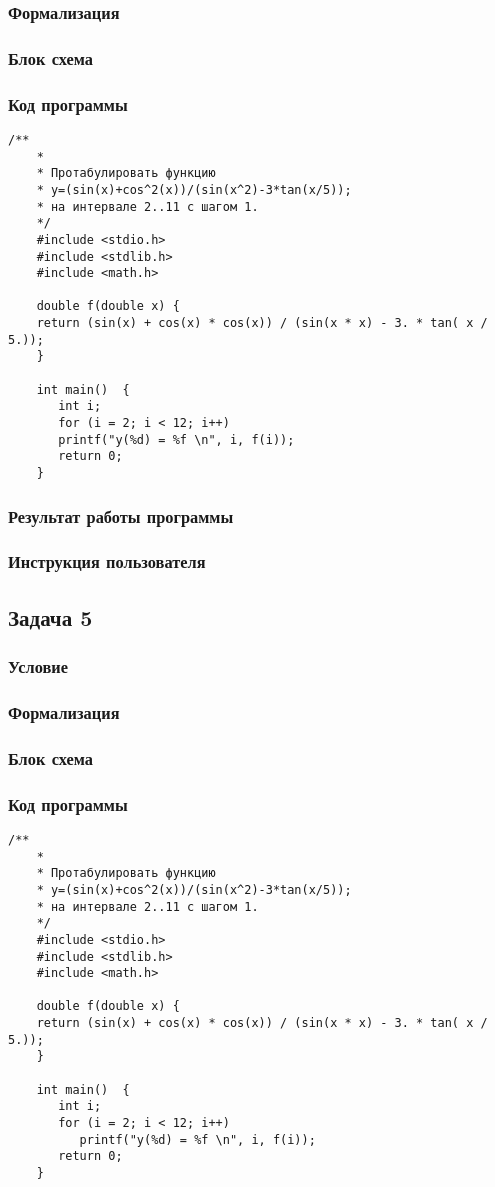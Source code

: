 \documentclass[simple,14pt]{eskdtext}
\begin{document}
	\subsubsection{Формализация}
	\subsubsection{Блок схема}
	\subsubsection{Код программы}
	\begin{lstlisting}[label=some-code3,caption=Задача 4]
	/**
	*
	* Протабулировать функцию
	* y=(sin(x)+cos^2(x))/(sin(x^2)-3*tan(x/5));
	* на интервале 2..11 с шагом 1.
	*/
	#include <stdio.h>
	#include <stdlib.h>
	#include <math.h>
	
	double f(double x) {
	return (sin(x) + cos(x) * cos(x)) / (sin(x * x) - 3. * tan( x / 5.));
	}
	
	int main()	{
	   int i;
	   for (i = 2; i < 12; i++)
	   printf("y(%d) = %f \n", i, f(i));
	   return 0;
	}
	\end{lstlisting}
	\subsubsection{Результат работы программы}
	\subsubsection{Инструкция пользователя}
	
	\subsection{Задача 5}
	\subsubsection{Условие}
	\subsubsection{Формализация}
	\subsubsection{Блок схема}
	\subsubsection{Код программы}
	\begin{lstlisting}[label=some-code3,caption=Задача 5]
	/**
	*
	* Протабулировать функцию
	* y=(sin(x)+cos^2(x))/(sin(x^2)-3*tan(x/5));
	* на интервале 2..11 с шагом 1.
	*/
	#include <stdio.h>
	#include <stdlib.h>
	#include <math.h>
	
	double f(double x) {
	return (sin(x) + cos(x) * cos(x)) / (sin(x * x) - 3. * tan( x / 5.));
	}
	
	int main()	{
	   int i;
	   for (i = 2; i < 12; i++)
	      printf("y(%d) = %f \n", i, f(i));
	   return 0;
	}
	\end{lstlisting}
\end{document}
